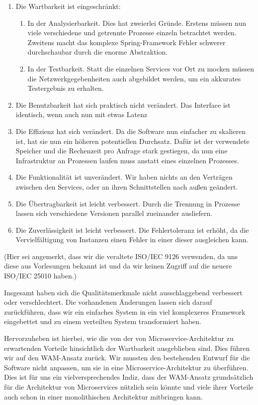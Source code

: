 \documentclass{article}
\begin{document}
\begin{enumerate}
	\item Die Wartbarkeit ist eingeschränkt:
		\begin{enumerate}
			\item In der Analysierbarkeit.
			Dies hat zweierlei Gründe.
			Erstens müssen nun viele verschiedene und getrennte Prozesse einzeln betrachtet werden.
			Zweitens macht das komplexe Spring-Framework Fehler schwerer durchschaubar durch die enorme Abstraktion.
			\item In der Testbarkeit. Statt die einzelnen Services vor Ort zu mocken müssen die Netzwerkgegebenheiten auch abgebildet werden, um ein akkurates Testergebnis zu erhalten.
	\end{enumerate}
	\item Die Benutzbarkeit hat sich praktisch nicht verändert. Das Interface ist identisch, wenn auch nun mit etwas Latenz
	\item Die Effizienz hat sich verändert.
	Da die Software nun einfacher zu skalieren ist, hat sie nun ein höheren potentiellen Durchsatz.
	Dafür ist der verwendete Speicher und die Rechenzeit pro Anfrage stark gestiegen, da nun eine Infrastruktur an Prozessen laufen muss anstatt eines einzelnen Prozesses.
	\item Die Funktionalität ist unverändert.
	Wir haben nichts an den Verträgen zwischen den Services, oder an ihren Schnittstellen nach außen geändert.
	\item Die Übertragbarkeit ist leicht verbessert.
	Durch die Trennung in Prozesse lassen sich verschiedene Versionen parallel zueinander ausliefern.
	\item Die Zuverlässigkeit ist leicht verbessert.
	Die Fehlertoleranz ist erhöht, da die Vervielfältigung von Instanzen einen Fehler in einer dieser ausgleichen kann.
\end{enumerate}

(Hier sei angemerkt, dass wir die veraltete ISO/IEC 9126 verwenden, da uns diese aus Vorlesungen bekannt ist und da wir keinen Zugriff auf die neuere ISO/IEC 25010 haben.)

Insgesamt haben sich die Qualitätsmerkmale nicht ausschlaggebend verbessert oder verschlechtert.
Die vorhandenen Änderungen lassen sich darauf zurückführen, dass wir ein einfaches System in ein viel komplexeres Framework eingebettet und zu einem verteilten System transformiert haben.

Hervorzuheben ist hierbei, wie die von der von Microservice-Architektur zu erwartenden Vorteile  hinsichtlich der Wartbarkeit ausgeblieben sind.
Dies führen wir auf den WAM-Ansatz zurück.
Wir mussten den bestehenden Entwurf für die Software nicht anpassen, um sie in eine Microservice-Architektur zu überführen.
Dies ist für uns ein vielversprechendes Indiz, dass der WAM-Ansatz grundsätzlich für die Architektur von Microservices nützlich sein könnte und viele ihrer Vorteile auch schon in einer monolithischen Architektur mitbringen kann.
\end{document}

